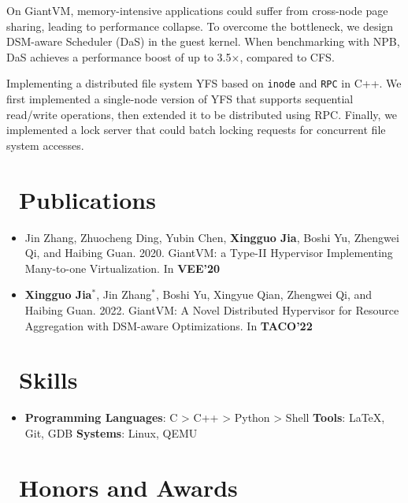 \documentclass{resume}
\begin{document}
On GiantVM, memory-intensive applications could suffer from cross-node page sharing, leading to performance collapse. To overcome the bottleneck, we design DSM-aware Scheduler (DaS) in the guest kernel. When benchmarking with NPB, DaS achieves a performance boost of up to 3.5$\times$, compared to CFS. 


Implementing a distributed file system YFS based on \texttt{inode} and \texttt{RPC} in C++. We first implemented a single-node version of YFS that supports sequential read/write operations, then extended it to be distributed using RPC. Finally, we implemented a lock server that could batch locking requests for concurrent file system accesses.

\section{\faGraduationCap\ Publications}
\begin{itemize}
\item Jin Zhang, Zhuocheng Ding, Yubin Chen, \textbf{Xingguo Jia}, Boshi Yu, Zhengwei Qi, and Haibing Guan. 2020. GiantVM: a Type-II Hypervisor Implementing Many-to-one Virtualization. In \textbf{VEE'20}
\item \textbf{Xingguo Jia$^*$}, Jin Zhang$^*$, Boshi Yu, Xingyue Qian, Zhengwei Qi, and Haibing Guan. 2022. GiantVM: A Novel Distributed Hypervisor for Resource Aggregation with DSM-aware Optimizations. In \textbf{TACO'22}
\end{itemize}

\section{\faCogs\ Skills}
\begin{itemize}[parsep=0.5ex]
  \item \textbf{Programming Languages}: C > C++ > Python > Shell \textbf{Tools}: \LaTeX, Git, GDB \textbf{Systems}: Linux, QEMU
\end{itemize}

\section{\faHeartO\ Honors and Awards}
\end{document}
